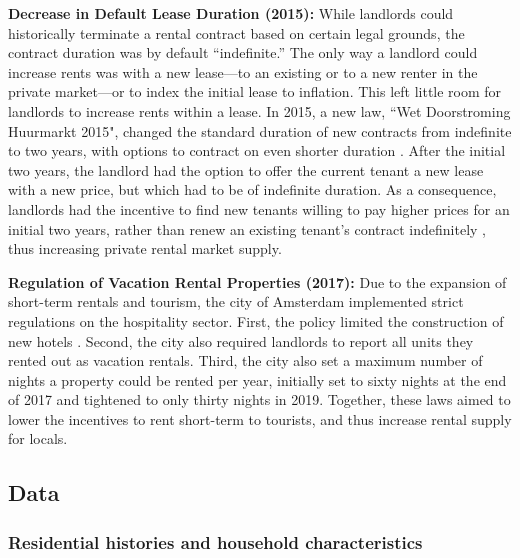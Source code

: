 \documentclass[11pt]{article}
\newcommand{\Paragraph}{\vspace{0.1cm}\noindent\textbf}
\begin{document}
\Paragraph{Decrease in Default Lease Duration (2015):} While landlords could historically terminate a rental contract based on certain legal grounds, the contract duration was by default ``indefinite.'' The only way a landlord could increase rents was with a new lease---to an existing or to a new renter in the private market---or to index the initial lease to inflation. This left little room for landlords to increase rents within a lease. In 2015, a new law, ``Wet Doorstroming Huurmarkt 2015", changed the standard duration of new contracts from indefinite to two years, with options to contract on even shorter duration \citep{koninkrijksrelaties_wet_nodate}. After the initial two years, the landlord had the option to offer the current tenant a new lease with a new price, but which had to be of indefinite duration. As a consequence, landlords had the incentive to find new tenants willing to pay higher prices for an initial two years, rather than renew an existing tenant's contract indefinitely \citep{koninkrijksrelaties_evaluatie_2021}, thus increasing private rental market supply.

\Paragraph{Regulation of Vacation Rental Properties (2017):} Due to the expansion of short-term rentals and tourism, the city of Amsterdam  implemented strict regulations on the hospitality sector. First, the policy limited the construction of new hotels \citep{botman_wet_2021}. Second, the city also required landlords to report all units they rented out as vacation rentals. Third, the city also set a maximum number of nights a property could be rented per year, initially set to sixty nights at the end of 2017 and tightened to only thirty nights in 2019. Together, these laws aimed to lower the incentives to rent short-term to tourists, and thus increase rental supply for locals. 




\subsection{Data}\label{sec: appendix data}

\subsubsection{Residential histories and household characteristics}\label{sec: appendix data demographics}
\end{document}

